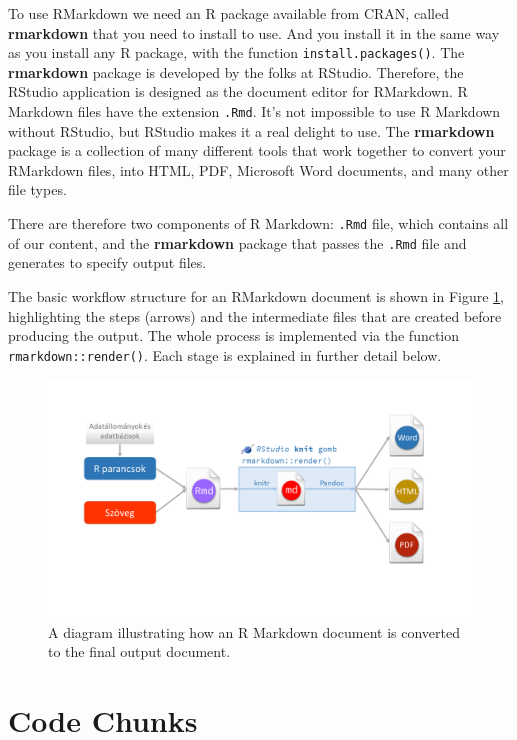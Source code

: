 \documentclass[
]{book}
\begin{document}
To use RMarkdown we need an R package available from CRAN, called \textbf{rmarkdown} that you need to install to use. And you install it in the same way as you install any R package, with the function \texttt{install.packages()}. The \textbf{rmarkdown} package is developed by the folks at RStudio. Therefore, the RStudio application is designed as the document editor for RMarkdown. R Markdown files have the extension \texttt{.Rmd}. It's not impossible to use R Markdown without RStudio, but RStudio makes it a real delight to use. The \textbf{rmarkdown} package is a collection of many different tools that work together to convert your RMarkdown files, into HTML, PDF, Microsoft Word documents, and many other file types.

There are therefore two components of R Markdown: \texttt{.Rmd} file, which contains all of our content, and the \textbf{rmarkdown} package that passes the \texttt{.Rmd} file and generates to specify output files.

The basic workflow structure for an RMarkdown document is shown in Figure \ref{fig:rm-pic}, highlighting the steps (arrows) and the intermediate files that are created before producing the output. The whole process is implemented via the function \texttt{rmarkdown::render()}. Each stage is explained in further detail below.

\begin{figure}
\includegraphics[width=15.33in]{image/rmarkdown} \caption{A diagram illustrating how an R Markdown document is converted to the final output document.}\label{fig:rm-pic}
\end{figure}

\hypertarget{code-chunks}{%
\section{Code Chunks}\label{code-chunks}}
\end{document}
